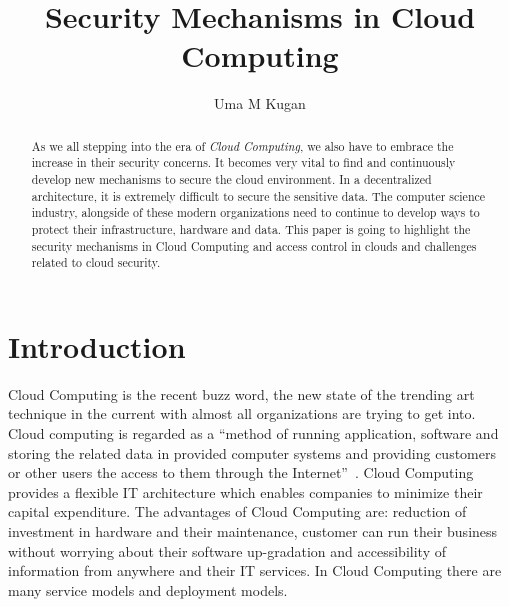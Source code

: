 
\title{Security Mechanisms in Cloud Computing}

\author{Uma M Kugan}
\renewcommand{\shortauthors}{Uma Kugan}

\begin{abstract}
As we all stepping into the era of \emph{Cloud Computing}, we also have to embrace
the increase in their security concerns. It becomes very vital to find and 
continuously develop new mechanisms to secure the cloud environment. In a 
decentralized architecture, it is extremely difficult to secure the sensitive
data. The computer science industry, alongside of these modern  organizations
need to continue to develop ways to protect their infrastructure, hardware 
and data. This paper is going to highlight the security mechanisms in Cloud
Computing and access control in clouds and challenges related to cloud security.
\end{abstract}


\maketitle

\section{Introduction}
Cloud Computing is the recent buzz word, the new state of the trending 
art technique in the current with almost all organizations are trying
to get into. Cloud computing is regarded as a ``method of running application, 
software and storing the related data in provided computer systems and 
providing customers or other users the access to them through the 
Internet''~\cite{hid-sp18-513-cloud1}. Cloud Computing provides a flexible IT 
architecture which enables companies to minimize their capital expenditure. 
The advantages of Cloud Computing are: reduction of investment in hardware 
and their maintenance, customer can run their business without worrying 
about their software up-gradation and accessibility of information from 
anywhere and their IT services. In Cloud Computing there are many service 
models and deployment models. 

